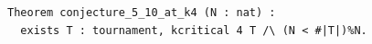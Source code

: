 \begin{lstlisting}[language=Rocq]
Theorem conjecture_5_10_at_k4 (N : nat) :
  exists T : tournament, kcritical 4 T /\ (N < #|T|)%N.
\end{lstlisting}
